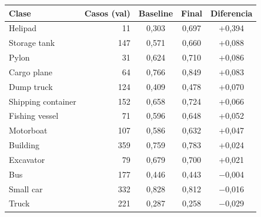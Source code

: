 \begin{tabular}{lrccc}
\toprule
Clase & Casos (val) & Baseline & Final & Diferencia \\
\midrule
Helipad & 11 & 0,303 & 0,697 & +0,394 \\
Storage tank & 147 & 0,571 & 0,660 & +0,088 \\
Pylon & 31 & 0,624 & 0,710 & +0,086 \\
Cargo plane & 64 & 0,766 & 0,849 & +0,083 \\
Dump truck & 124 & 0,409 & 0,478 & +0,070 \\
Shipping container & 152 & 0,658 & 0,724 & +0,066 \\
Fishing vessel & 71 & 0,596 & 0,648 & +0,052 \\
Motorboat & 107 & 0,586 & 0,632 & +0,047 \\
Building & 359 & 0,759 & 0,783 & +0,024 \\
Excavator & 79 & 0,679 & 0,700 & +0,021 \\
Bus & 177 & 0,446 & 0,443 & $-$0,004 \\
Small car & 332 & 0,828 & 0,812 & $-$0,016 \\
Truck & 221 & 0,287 & 0,258 & $-$0,029 \\
\bottomrule
\end{tabular}
